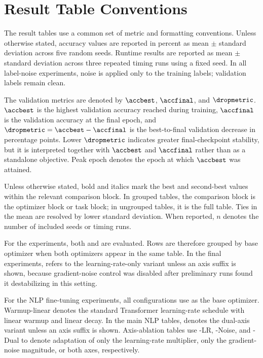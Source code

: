 \section{Result Table Conventions}
\label{sec:result-table-conventions}

The result tables use a common set of metric and formatting conventions. Unless otherwise
stated, accuracy values are reported in percent as mean $\pm$ standard deviation across
five random seeds. Runtime results are reported as mean $\pm$ standard deviation across
three repeated timing runs using a fixed seed. In all label-noise experiments, noise is
applied only to the training labels; validation labels remain clean.

The validation metrics are denoted by $\accbest$, $\accfinal$, and $\dropmetric$.
$\accbest$ is the highest validation accuracy reached during training, $\accfinal$ is
the validation accuracy at the final epoch, and
$\dropmetric = \accbest - \accfinal$ is the best-to-final validation decrease in
percentage points. Lower $\dropmetric$ indicates greater final-checkpoint stability, but
it is interpreted together with $\accbest$ and $\accfinal$ rather than as a standalone
objective. Peak epoch denotes the epoch at which $\accbest$ was attained.

Unless otherwise stated, bold and italics mark the best and second-best values within the
relevant comparison block. In grouped tables, the comparison block is the optimizer block
or task block; in ungrouped tables, it is the full table. Ties in the mean are resolved by
lower standard deviation. When reported, $n$ denotes the number of included seeds or
timing runs.

For the \cifar{} experiments, both \adamw{} and \sgdm{} are evaluated. Rows are therefore
grouped by base optimizer when both optimizers appear in the same table. In the final
\cifar{} experiments, \method{} refers to the learning-rate-only variant unless an axis
suffix is shown, because gradient-noise control was disabled after preliminary runs found
it destabilizing in this setting.

For the NLP fine-tuning experiments, all configurations use \adamw{} as the base optimizer.
Warmup-linear denotes the standard Transformer learning-rate schedule with linear warmup
and linear decay. In the main NLP tables, \method{} denotes the dual-axis variant unless
an axis suffix is shown. Axis-ablation tables use \method{}-LR, \method{}-Noise, and
\method{}-Dual to denote adaptation of only the learning-rate multiplier, only the
gradient-noise magnitude, or both axes, respectively.